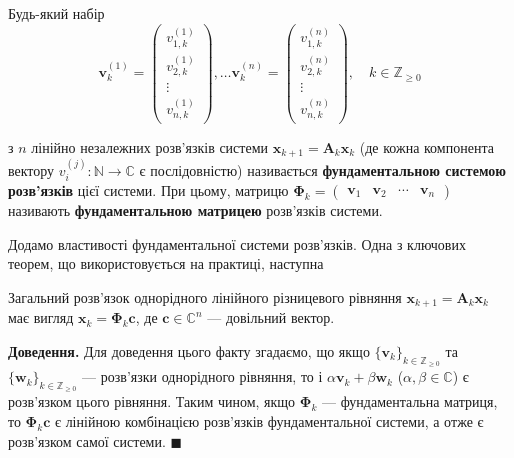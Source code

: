 \documentclass{hw_template}
\begin{document}
\begin{definition}
    Будь-який набір
    \begin{equation*}
        \boldsymbol{v}_{k}^{(1)} = \begin{pmatrix}
            v_{1,k}^{(1)} \\
            v_{2,k}^{(1)} \\
            \vdots \\
            v_{n,k}^{(1)}
        \end{pmatrix}, \dots \boldsymbol{v}_{k}^{(n)} = \begin{pmatrix}
            v_{1,k}^{(n)} \\
            v_{2,k}^{(n)} \\
            \vdots \\
            v_{n,k}^{(n)}
        \end{pmatrix}, \quad k \in \mathbb{Z}_{\geq 0}
    \end{equation*}

    з $n$ лінійно незалежних розв'язків системи $\mathbf{x}_{k+1} = \boldsymbol{A}_k\mathbf{x}_k$ (де кожна 
    компонента вектору $v_{i}^{(j)}: \mathbb{N} \to \mathbb{C}$ є послідовністю) називається
    \textbf{фундаментальною системою розв'язків} цієї системи. При цьому, матрицю $\boldsymbol{\Phi}_k = \begin{pmatrix}
        \boldsymbol{v}_1 & \boldsymbol{v}_2 & \cdots & \boldsymbol{v}_n
    \end{pmatrix}$ називають \textbf{фундаментальною матрицею} розв'язків системи.
\end{definition}

Додамо властивості фундаментальної системи розв'язків. Одна з ключових теорем,
що використовується на практиці, наступна

\begin{theorem}
    Загальний розв'язок однорідного лінійного різницевого рівняння $\mathbf{x}_{k+1} = \boldsymbol{A}_k\mathbf{x}_k$
    має вигляд $\mathbf{x}_k = \boldsymbol{\Phi}_k\boldsymbol{c}$, де $\boldsymbol{c} \in \mathbb{C}^n$ --- довільний вектор.
\end{theorem}

\textbf{Доведення.} Для доведення цього факту згадаємо, що якщо
$\{\boldsymbol{v}_k\}_{k \in \mathbb{Z}_{\geq 0}}$ та $\{\boldsymbol{w}_k\}_{k
\in \mathbb{Z}_{\geq 0}}$ --- розв'язки однорідного рівняння, то і
$\alpha\boldsymbol{v}_k + \beta\boldsymbol{w}_k$ ($\alpha,\beta \in \mathbb{C}$)
є розв'язком цього рівняння. Таким чином, якщо $\boldsymbol{\Phi}_k$ ---
фундаментальна матриця, то $\boldsymbol{\Phi}_k\boldsymbol{c}$ є лінійною 
комбінацією розв'язків фундаментальної системи, а отже є розв'язком самої
системи. $\blacksquare$
\end{document}
